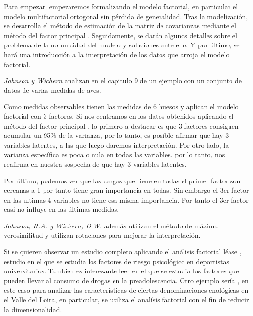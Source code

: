 \noindent Para empezar, empezaremos formalizando el modelo factorial, en particular el modelo multifactorial ortogonal \cite{Johnson 2007} sin pérdida de generalidad. Tras la modelización, se desarrolla el método de estimación de la matriz de covarianzas  mediante el método del factor principal \cite{Peña 2002}. Seguidamente, se darán algunos detalles sobre el problema de la no unicidad del modelo y soluciones ante ello. Y por último, se hará una introducción a la interpretación de los datos que arroja el modelo factorial. 

\noindent \emph{Johnson y Wichern } analizan en el capitulo 9 de \cite{Johnson 2007} un ejemplo con un conjunto de datos de varias medidas de aves. 

\noindent Como medidas observables tienen las medidas de 6 huesos y aplican el modelo factorial con 3 factores. Si nos centramos en los datos obtenidos aplicando el método del factor principal \cite{Peña 2002, Johnson 2007}, lo primero a destacar es que 3 factores consiguen acumular un 95\% de la varianza, por lo tanto, es posible afirmar que hay 3 variables latentes, a las que luego daremos interpretación. Por otro lado, la varianza específica es poca o nula en todas las variables, por lo tanto, nos reafirma en nuestra sospecha de que hay 3 variables latentes. 

\noindent Por último, podemos ver que las cargas que tiene en todas el primer factor son cercanas a 1 por tanto tiene gran importancia en todas. Sin embargo el 3er factor en las ultimas 4 variables no tiene esa misma importancia. Por tanto el 3er factor casi no influye en las últimas medidas. 

\noindent \emph{Johnson, R.A. y Wichern, D.W.}\cite{Johnson 2007} además utilizan el método de máxima verosimilitud y utilizan rotaciones para mejorar la interpretación.

\noindent Si se quieren observar un estudio completo aplicando el análisis factorial léase \cite{Galindo 2015}, estudio en el que se estudia los factores de riesgo psicológico en deportistas universitarios.  También es interesante leer \cite{Diez 2002} en el que se estudia los factores que pueden llevar al consumo de drogas en la preadolescencia. Otro ejemplo sería \cite{Pages 2005}, en este caso para analizar las características de ciertas denominaciones  enológicas en el Valle del Loira, en particular, se utiliza el analísis factorial con el fin de reducir la dimensionalidad. 



